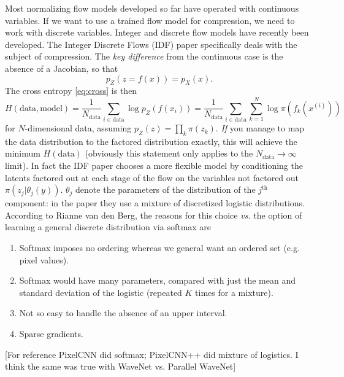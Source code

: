 \documentclass[preprint,notitlepage]{revtex4-1}
\begin{document}
Most normalizing flow models developed so far have operated with continuous variables. If we want to use a trained flow model for compression, we need to work with discrete variables. Integer \cite{Hoogeboom:2019aa} and discrete \cite{Tran:2019aa} flow models have recently been developed. The Integer Discrete Flows (IDF) paper \cite{Hoogeboom:2019aa} specifically deals with the subject of compression. The \emph{key difference} from the continuous case is the absence of a Jacobian, so that
%
\begin{equation}
  p_Z(z=f(x))= p_X(x).
\end{equation}
%
The cross entropy \eqref{eq:cross} is then
%
\begin{equation}
  H(\text{data}, \text{model}) = \frac{1}{N_\text{data}}\sum_{i\in \text{data}} \log p_Z(f(x_i))=\frac{1}{N_\text{data}}\sum_{i\in \text{data}}\sum_{k=1}^N \log \pi(f_k(x^{(i)}))
\end{equation}
%
for $N$-dimensional data, assuming $p_Z(z)=\prod_k \pi(z_k)$. \emph{If} you manage to map the data distribution to the factored distribution exactly, this will achieve the minimum $H(\text{data})$ (obviously this statement only applies to the $N_\text{data}\to\infty$ limit). In fact the IDF paper chooses a more flexible model by conditioning the latents factored out at each stage of the flow on the variables not factored out $\pi(z_j|\theta_j(y))$. $\theta_j$ denote the parameters of the distribution of the $j^\text{th}$ component: in the paper they use a mixture of discretized logistic distributions. According to Rianne van den Berg, the reasons for this choice \emph{vs.} the option of learning a general discrete distribution via softmax are

\begin{enumerate}
  \item Softmax imposes no ordering whereas we general want an ordered set (e.g. pixel values).
  \item Softmax would have many parameters, compared with just the mean and standard deviation of the logistic (repeated $K$ times for a mixture).
  \item Not so easy to handle the absence of an upper interval.
  \item Sparse gradients.

\end{enumerate}

[For reference PixelCNN did softmax; PixelCNN++ did mixture of logistics. I think the same was true with WaveNet vs. Parallel WaveNet]
\end{document}
